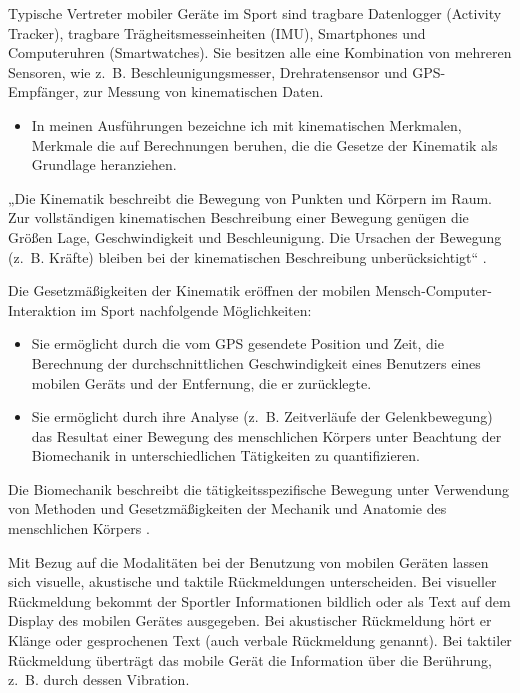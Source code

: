 Typische Vertreter mobiler Geräte im Sport sind tragbare Datenlogger (Activity Tracker), tragbare Trägheitsmesseinheiten (\ac{IMU}), Smartphones und Computeruhren (Smartwatches). Sie besitzen alle eine Kombination von mehreren Sensoren, wie z.~B. Beschleunigungsmesser, Drehratensensor und \acs{GPS}-Empfänger, zur Messung von kinematischen Daten. 
\begin{itemize}
	
	\item In meinen Ausführungen bezeichne ich mit kinematischen Merkmalen, Merkmale die auf Berechnungen beruhen, die die Gesetze der Kinematik als Grundlage heranziehen. 
\end{itemize}

„Die Kinematik beschreibt die Bewegung von Punkten und Körpern im Raum. Zur vollständigen kinematischen Beschreibung einer Bewegung genügen die Größen Lage, Geschwindigkeit und Beschleunigung. Die Ursachen der Bewegung (z.~B. Kräfte) bleiben bei der kinematischen Beschreibung unberücksichtigt“ \citep[][S.~57]{Disselhorst-Klug2015}.

Die Gesetzmäßigkeiten der Kinematik eröffnen der mobilen Mensch-Computer-Interaktion im Sport nachfolgende Möglichkeiten: 
\begin{itemize}
	\item Sie ermöglicht durch die vom \acs{GPS} gesendete Position und Zeit, die Berechnung der durchschnittlichen Geschwindigkeit eines Benutzers eines mobilen Geräts und der Entfernung, die er zurücklegte. 
	\item Sie ermöglicht durch ihre Analyse (z.~B. Zeitverläufe der Gelenkbewegung) das Resultat einer Bewegung des menschlichen Körpers unter Beachtung der Biomechanik in unterschiedlichen Tätigkeiten zu quantifizieren. 
\end{itemize}

Die Biomechanik beschreibt die tätigkeitsspezifische Bewegung unter Verwendung von Methoden und Gesetzmäßigkeiten der Mechanik und Anatomie des menschlichen Körpers \citep[][S.~2ff.]{Winter2009}.

Mit Bezug auf die Modalitäten bei der Benutzung von mobilen Geräten lassen sich visuelle, akustische und taktile Rückmeldungen unterscheiden. Bei visueller Rückmeldung bekommt der Sportler Informationen bildlich oder als Text auf dem Display des mobilen Gerätes ausgegeben. Bei akustischer Rückmeldung hört er Klänge oder gesprochenen Text (auch verbale Rückmeldung genannt). Bei taktiler Rückmeldung überträgt das mobile Gerät die Information über die Berührung, z.~B. durch dessen Vibration.

